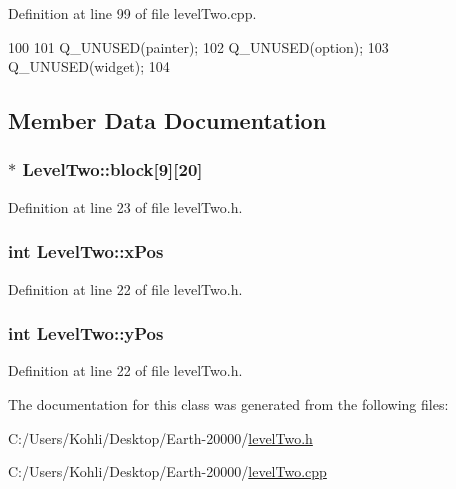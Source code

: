 Definition at line 99 of file levelTwo.cpp.


\begin{DoxyCode}
100 {
101     Q_UNUSED(painter);
102     Q_UNUSED(option);
103     Q_UNUSED(widget);
104 }
\end{DoxyCode}


\subsection{Member Data Documentation}
\hypertarget{class_level_two_ae2fcfa7a9a4c9feb00058ed9ab8c72d6}{
\subsubsection[{block}]{$\ast$ {\bf LevelTwo::block}\mbox{[}9\mbox{]}\mbox{[}20\mbox{]}}}
\label{class_level_two_ae2fcfa7a9a4c9feb00058ed9ab8c72d6}


Definition at line 23 of file levelTwo.h.\hypertarget{class_level_two_a4987ce2b3abc9e124dfa2a33dd317474}{
\subsubsection[{xPos}]{\setlength{\rightskip}{0pt plus 5cm}int {\bf LevelTwo::xPos}}}
\label{class_level_two_a4987ce2b3abc9e124dfa2a33dd317474}


Definition at line 22 of file levelTwo.h.\hypertarget{class_level_two_ade98d942c5c10cf270c92d918417f0ef}{
\subsubsection[{yPos}]{\setlength{\rightskip}{0pt plus 5cm}int {\bf LevelTwo::yPos}}}
\label{class_level_two_ade98d942c5c10cf270c92d918417f0ef}


Definition at line 22 of file levelTwo.h.

The documentation for this class was generated from the following files:\begin{DoxyCompactItemize}
\item 
C:/Users/Kohli/Desktop/Earth-\/20000/\hyperlink{level_two_8h}{levelTwo.h}\item 
C:/Users/Kohli/Desktop/Earth-\/20000/\hyperlink{level_two_8cpp}{levelTwo.cpp}\end{DoxyCompactItemize}

